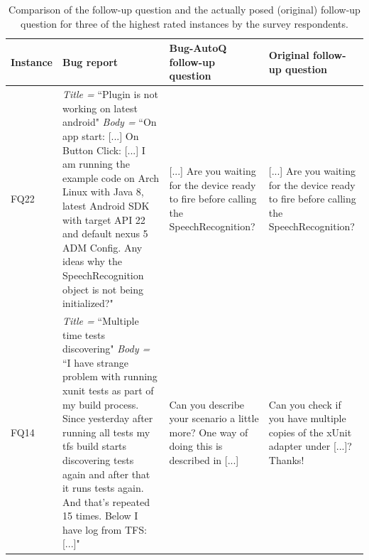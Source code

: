 \begin{table}[t]
	\scriptsize
	\centering
	\caption{Comparison of the \evpi follow-up question and the actually posed (original) follow-up question for three of the highest rated instances by the survey respondents.}
	\begin{tabular}{ |M{1cm}|p{7.3cm}|p{4cm}|p{4cm}|  }		\hline
		Instance &Bug report & Bug-AutoQ follow-up question & Original follow-up question\\		\hline

		FQ22
		&{\em Title =} ``Plugin is not working on latest android" \newline
		{\em Body =} ``On app start: [...] \newline
		On Button Click: [...] \newline
		I am running the example code on Arch Linux with Java 8, latest Android SDK with target API 22 and default nexus 5 ADM Config.
		Any ideas why the SpeechRecognition object is not being initialized?"
		& [...] Are you waiting for the device ready to fire before calling the SpeechRecognition?
		& [...] Are you waiting for the device ready to fire before calling the SpeechRecognition?\\ \hline

		FQ14
		&{\em Title =} ``Multiple time tests discovering" \newline
		{\em Body =} ``I have strange problem with running xunit tests as part of my build process. Since yesterday after running all tests my tfs build starts discovering tests again and after that it runs tests again. And that's repeated 15 times.
		Below I have log from TFS: [...]"
		& Can you describe your scenario a little more? One way of doing this is described in [...]
		& Can you check if you have multiple copies of the xUnit adapter under [...]? Thanks! \\ \hline
		

\end{tabular}
\end{table}
